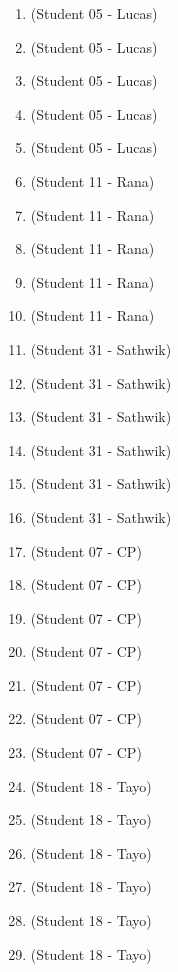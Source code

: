 \begin{enumerate}[label=\#\arabic*]
\item \cite{kiyasu1995measurement} (Student 05 - Lucas)
\item \cite{dehnhardt1988universal} (Student 05 - Lucas)
\item \cite{ali1989pseudorandom} (Student 05 - Lucas)
\item \cite{jia2011construction} (Student 05 - Lucas)
\item \cite{ozturk1996generation} (Student 05 - Lucas)
\item \cite{blackburn2025bruijn} (Student 11 - Rana)
\item \cite{pages2005optimised} (Student 11 - Rana)
\item \cite{mitchell1997bruijn} (Student 11 - Rana)
\item \cite{delorme1998spectrum} (Student 11 - Rana)
\item \cite{burkhardt1994implementing} (Student 11 - Rana)
\item \cite{kreitzer2024alternating} (Student 31 - Sathwik)
\item \cite{ivanyi1990three} (Student 31 - Sathwik)
\item \cite{jia2021oneshot} (Student 31 - Sathwik)
\item \cite{jeught2013robust} (Student 31 - Sathwik)
\item \cite{ma2021bayesian} (Student 31 - Sathwik)
\item \cite{chee2022robust} (Student 31 - Sathwik)
\item \cite{zach2025puzzlepoles} (Student 07 - CP)
\item \cite{schmid2022determining} (Student 07 - CP)
\item \cite{etzion2011sequence} (Student 07 - CP)
\item \cite{fang2015one} (Student 07 - CP)
\item \cite{spoelder1998some} (Student 07 - CP)
\item \cite{goubin2004construction} (Student 07 - CP)
\item \cite{marcovich2023zero} (Student 07 - CP)
\item \cite{bernad2023data} (Student 18 - Tayo)
\item \cite{adamson2023k} (Student 18 - Tayo)
\item \cite{rockey2014compactly} (Student 18 - Tayo)
\item \cite{you20256} (Student 18 - Tayo)
\item \cite{engel2008stability} (Student 18 - Tayo)
\item \cite{elishco2021repeat} (Student 18 - Tayo)

\end{enumerate}
